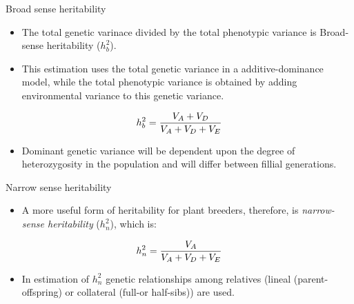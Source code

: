 \documentclass[11pt,ignorenonframetext,aspectratio=169]{beamer}
\providecommand{\tightlist}{%
  \setlength{\itemsep}{0pt}\setlength{\parskip}{0pt}}
\begin{document}
\begin{frame}{}
\protect\hypertarget{section-8}{}
\begin{block}{Broad sense heritability}
\protect\hypertarget{broad-sense-heritability}{}
\footnotesize

\begin{itemize}
\tightlist
\item
  The total genetic varinace divided by the total phenotypic variance is
  Broad-sense heritability (\(h_b^2\)).
\item
  This estimation uses the total genetic variance in a
  additive-dominance model, while the total phenotypic variance is
  obtained by adding environmental variance to this genetic variance.
\end{itemize}

\[
\small
h_b^2 = \frac{V_A + V_D}{V_A + V_D + V_E}
\]

\begin{itemize}
\tightlist
\item
  Dominant genetic variance will be dependent upon the degree of
  heterozygosity in the population and will differ between fillial
  generations.
\end{itemize}
\end{block}

\begin{block}{Narrow sense heritability}
\protect\hypertarget{narrow-sense-heritability}{}
\footnotesize

\begin{itemize}
\tightlist
\item
  A more useful form of heritability for plant breeders, therefore, is
  \emph{narrow-sense heritability} (\(h_n^2\)), which is:
\end{itemize}

\[
\small
h_n^2 = \frac{V_A}{V_A+V_D+V_E}
\]

\begin{itemize}
\tightlist
\item
  In estimation of \(h^2_n\) genetic relationships among relatives
  (lineal (parent-offspring) or collateral (full-or half-sibs)) are
  used.
\end{itemize}
\end{block}
\end{frame}
\end{document}
